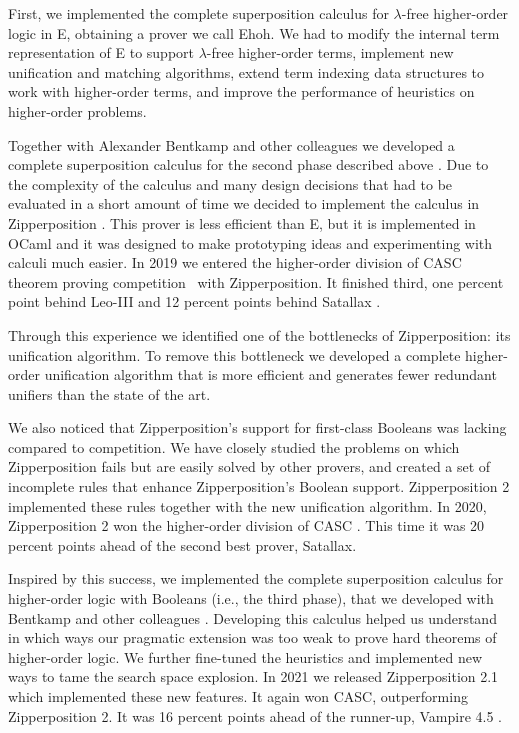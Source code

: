   
  First, we implemented the complete superposition calculus for $\lambda$-free
  higher-order logic \cite{bbcw-21-lfho} in E, obtaining a prover we call Ehoh.
  We had to modify the internal term representation of E to support $\lambda$-free
  higher-order terms, implement new unification and matching algorithms, extend
  term indexing data structures to work with higher-order terms, and improve the
  performance of heuristics on higher-order problems.
  
  Together with Alexander Bentkamp and other colleagues we developed
  a complete superposition calculus for the second phase described above
  \cite{bbtvw-21-sup-lam}. Due to the complexity of the calculus and many design
  decisions that had to be evaluated in a short amount of time we decided to
  implement the calculus in Zipperposition \cite{sc-15-simon-phd,sc-supind-17}. This prover is less efficient than
  E, but it is implemented in OCaml and it was designed to make prototyping
  ideas and experimenting with calculi much easier. In 2019 we entered the
  higher-order division of CASC theorem proving competition~\cite{gs-19-casc27} with Zipperposition. 
  It finished third, one percent point behind Leo-III
  \cite{sb-21-leo3}  and 12 percent points behind  Satallax
  \cite{cb-12-satallax}.
  
  Through this experience we identified one of the bottlenecks of
  Zipperposition: its unification algorithm. To remove this bottleneck we
  developed a complete higher-order unification algorithm that is more
  efficient and generates fewer redundant unifiers than the state of the art. 
  
  We also noticed that Zipperposition's support for first-class Booleans
  was lacking compared to competition. We have closely studied the problems on
  which Zipperposition fails but are easily solved by other provers, and created
  a set of incomplete rules that enhance Zipperposition's Boolean support.
  Zipperposition 2 implemented these rules together with the new unification
  algorithm. In 2020, Zipperposition 2 won the higher-order division
  of CASC \cite{gs-21-cascj10}. This time it was 20 percent points ahead of the second best
  prover, Satallax.
  
  Inspired by this success, we implemented the complete superposition
  calculus for higher-order logic with Booleans (i.e., the third phase), that we developed with Bentkamp and other
  colleagues \cite{bbtv-21-full-ho-sup}. Developing this calculus helped us understand in which
  ways our pragmatic extension was too weak to prove hard theorems of
  higher-order logic. We further fine-tuned the heuristics and implemented new ways
  to tame the search space explosion. In 2021 we released Zipperposition 2.1
  which implemented these new features. It again won
  CASC, outperforming Zipperposition 2. It was 16 percent points ahead of the
  runner-up, Vampire 4.5 \cite{lkav-13-vampire}. 
  
